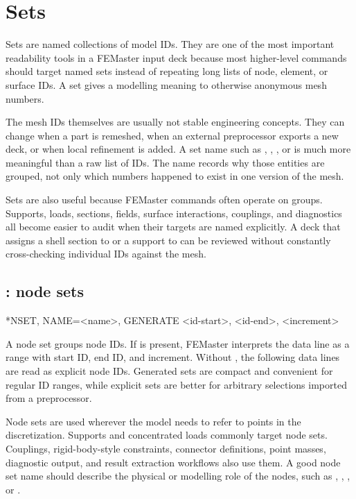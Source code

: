 \chapter{Sets}
\label{chap:sets}

Sets are named collections of model IDs. They are one of the most important readability tools in a FEMaster input deck because most higher-level commands should target named sets instead of repeating long lists of node, element, or surface IDs. A set gives a modelling meaning to otherwise anonymous mesh numbers.

The mesh IDs themselves are usually not stable engineering concepts. They can change when a part is remeshed, when an external preprocessor exports a new deck, or when local refinement is added. A set name such as , , , or  is much more meaningful than a raw list of IDs. The name records why those entities are grouped, not only which numbers happened to exist in one version of the mesh.

Sets are also useful because FEMaster commands often operate on groups. Supports, loads, sections, fields, surface interactions, couplings, and diagnostics all become easier to audit when their targets are named explicitly. A deck that assigns a shell section to  or a support to  can be reviewed without constantly cross-checking individual IDs against the mesh.

\section{: node sets}

\begin{syntax}
*NSET, NAME=<name>, GENERATE
<id-start>, <id-end>, <increment>
\end{syntax}

A node set groups node IDs. If  is present, FEMaster interprets the data line as a range with start ID, end ID, and increment. Without , the following data lines are read as explicit node IDs. Generated sets are compact and convenient for regular ID ranges, while explicit sets are better for arbitrary selections imported from a preprocessor.

Node sets are used wherever the model needs to refer to points in the discretization. Supports and concentrated loads commonly target node sets. Couplings, rigid-body-style constraints, connector definitions, point masses, diagnostic output, and result extraction workflows also use them. A good node set name should describe the physical or modelling role of the nodes, such as , , , or .

